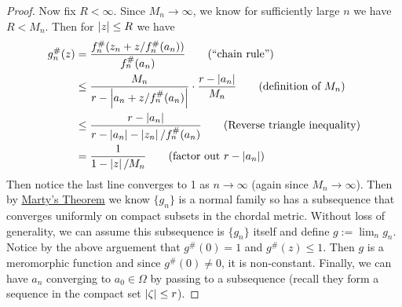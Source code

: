\begin{proof}
    Now fix $R < \infty$. Since $M_n \to \infty$, we know for sufficiently large $n$ we have $R < M_n$. Then for $\left|z\right| \leq R$ we have 
    \begin{align}
        g_n^\#(z) &= \frac{f_n^\#(z_n + z/f_n^\#(a_n))}{f_n^\#(a_n)} \tag{``chain rule''}\\
        &\leq \frac{M_n}{r - \abs{a_n + z/f_n^\#(a_n)}} \cdot \frac{r - \abs{a_n}}{M_n} \tag{definition of $M_n$}\\
        &\leq \frac{r - \abs{a_n}}{r - \abs{a_n} - \abs{z_n}/f_n^\#(a_n)} \tag{Reverse triangle inequality}\\
        &= \frac{1}{1 - \abs{z}/M_n} \tag{factor out $r - \abs{a_n}$}
    \end{align}
    Then notice the last line converges to 1 as $n \to \infty$ (again since $M_n \to \infty$). Then by \hyperref[thm:marty]{Marty's Theorem} we know $\{g_n\}$ is a normal family so has a subsequence that converges uniformly on compact subsets in the chordal metric. Without loss of generality, we can assume this subsequence is $\{g_n\}$ itself and define $g := \lim_n g_n$. Notice by the above arguement that $g^\#(0) = 1$ and $g^\#(z) \leq 1$. Then $g$ is a meromorphic function and since $g^\#(0) \neq 0$, it is non-constant. Finally, we can have $a_n$ converging to $a_0 \in \Omega$ by passing to a subsequence (recall they form a sequence in the compact set $\left|\zeta\right| \leq r$).
\end{proof}

